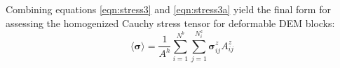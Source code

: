 Combining equations \ref{eqn:stress3} and \ref{eqn:stress3a} yield
the final form for assessing the homogenized Cauchy stress tensor
for deformable DEM blocks: 
\begin{equation}
\langle\boldsymbol{\sigma}\rangle=\frac{1}{A^{h}}\sum_{i=1}^{N^{b}}\sum_{j=1}^{N_{i}^{z}}\boldsymbol{\sigma}_{ij}^{z}A_{ij}^{z}\label{eqn:stress4}
\end{equation}



